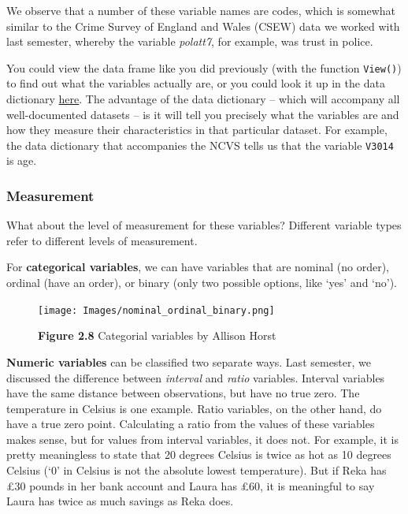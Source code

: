 \documentclass[
]{book}
\begin{document}
We observe that a number of these variable names are codes, which is somewhat similar to the Crime Survey of England and Wales (CSEW) data we worked with last semester, whereby the variable \emph{polatt7}, for example, was trust in police.

You could view the data frame like you did previously (with the function \texttt{View()}) to find out what the variables actually are, or you could look it up in the data dictionary \href{https://www.icpsr.umich.edu/web/ICPSR/series/95/variables}{here}. The advantage of the data dictionary -- which will accompany all well-documented datasets -- is it will tell you precisely what the variables are and how they measure their characteristics in that particular dataset. For example, the data dictionary that accompanies the NCVS tells us that the variable \texttt{V3014} is age.

\hypertarget{measurement}{%
\subsubsection*{Measurement}\label{measurement}}

What about the level of measurement for these variables? Different variable types refer to different levels of measurement.

For \textbf{categorical variables}, we can have variables that are nominal (no order), ordinal (have an order), or binary (only two possible options, like `yes' and `no').

\begin{figure}
\centering
\texttt{[image: Images/nominal\_ordinal\_binary.png]}
\caption{\textbf{Figure 2.8} Categorial variables by Allison Horst}
\end{figure}

\textbf{Numeric variables} can be classified two separate ways. Last semester, we discussed the difference between \emph{interval} and \emph{ratio} variables. Interval variables have the same distance between observations, but have no true zero. The temperature in Celsius is one example. Ratio variables, on the other hand, do have a true zero point. Calculating a ratio from the values of these variables makes sense, but for values from interval variables, it does not. For example, it is pretty meaningless to state that 20 degrees Celsius is twice as hot as 10 degrees Celsius (`0' in Celsius is not the absolute lowest temperature). But if Reka has £30 pounds in her bank account and Laura has £60, it is meaningful to say Laura has twice as much savings as Reka does.
\end{document}
